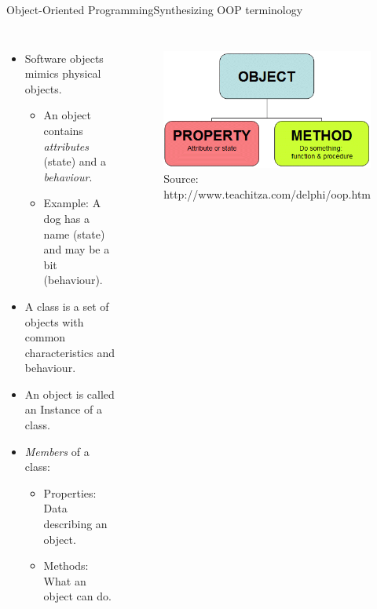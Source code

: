 \documentclass[10pt,compress]{beamer} %
\begin{document}
\begin{frame}{Object-Oriented Programming}{Synthesizing OOP terminology}
    \begin{columns}
 		  \begin{itemize}
			\item \small{Software objects mimics physical objects.} %
		   	\begin{itemize}
				\item \footnotesize{An object contains \textit{attributes} (state) and a \textit{behaviour}}. %
				\item \footnotesize{Example: A dog has a name (state) and may be a bit (behaviour).}
		  	\end{itemize}
		  	\item \small{A \alert{class} is a set of objects with common characteristics and behaviour.}
		  	\item \small{An \alert{object} is called an \alert{Instance} of a class.}
			\item \textit{Members} of a class:
		    	\begin{itemize}
				\item \footnotesize{\alert{Properties}: Data describing an object.}
				\item \footnotesize{\alert{Methods}: What an object can do.}%
		  	    \end{itemize}
		  \end{itemize}
	  	 	\begin{figure}[t]
			\begin{center}
			    \includegraphics[width=0.97\linewidth]{figs/object2}\\
				\tiny{Source: http://www.teachitza.com/delphi/oop.htm}
			\end{center}
  	 		\end{figure}
    \end{columns}
\end{frame}
\end{document}

